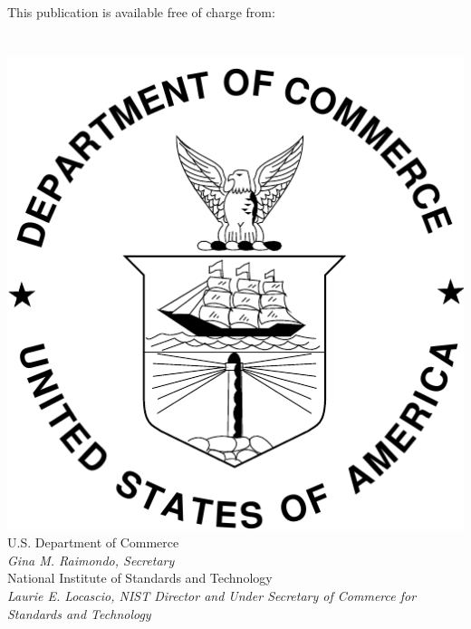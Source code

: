 \begin{titlepage}
\begin{flushright}
\normalsize This publication is available free of charge from:\\
\DOI\\
\vfill
\normalsize \pubmonth~\pubyear\\
\vfill
\includegraphics[width=0.2\linewidth]{../FIGURES/doc-logo-black.pdf}\\ 
\vfill
\footnotesize U.S. Department of Commerce\\ 
\textit{Gina M. Raimondo, Secretary}\\
\vspace{10pt}
National Institute of Standards and Technology\\ 
\hspace*{-3cm}\textit{Laurie E. Locascio, NIST Director and Under Secretary of Commerce for Standards and Technology}  
\end{flushright}
\end{titlepage}
